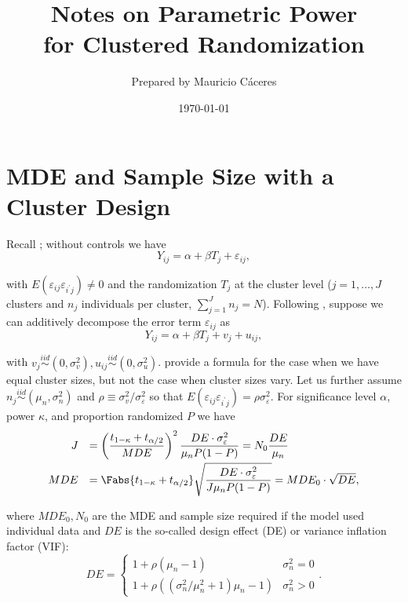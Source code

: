 \documentclass{article}
\title{\bfseries Notes on Parametric Power \\ for Clustered Randomization}
\author{\sffamily Prepared by Mauricio C\'aceres}
\date{\sffamily \today}
\renewcommand{\displayoptions}{
  \maketitle
  \pagenumbering{arabic}
}
\begin{document}
\displayoptions

\section{MDE and Sample Size with a Cluster Design}
\label{sec:mde_and_sample_size_with_a_cluster_design}

Recall ; without controls we have
\begin{equation}
\label{eq:cluster_reg}
Y_{ij} = \alpha + \beta T_j + \varepsilon_{ij},
\end{equation}

with $E (\varepsilon_{ij} \varepsilon_{i^\prime j}) \ne 0$ and the randomization $T_j$ at the cluster level ($j = 1, \ldots, J$ clusters and $n_j$ individuals per cluster, $\sum^{J}_{j = 1} n_j = N$). Following \citet[p. 3921-2]{DufloGlennersterKremer2007}, suppose we can additively decompose the error term $\varepsilon_{ij}$ as
\begin{equation}
\label{eq:cluster_reg_additive}
Y_{ij} = \alpha + \beta T_j + v_j + u_{ij},
\end{equation}

with $v_j \stackrel{iid}{\sim} (0, \sigma_v^2), u_{ij} \stackrel{iid}{\sim} (0, \sigma_u^2)$. \citeauthor{DufloGlennersterKremer2007} provide a formula for the case when we have equal cluster sizes, but not the case when cluster sizes vary. Let us further assume $n_j \stackrel{iid}{\sim} (\mu_n, \sigma^2_n)$ and $\rho \equiv \sigma_v^2 / \sigma_\varepsilon^2$ so that $E (\varepsilon_{ij} \varepsilon_{i^\prime j}) = \rho \sigma_\varepsilon^2$. For significance level $\alpha$, power $\kappa$, and proportion randomized $P$ we have
\begin{equation}
  \begin{array}{rl}
    J   & = \left(\dfrac{t_{1 - \kappa} + t_{\alpha / 2}}{MDE}\right)^2 \dfrac{DE \cdot \sigma_\varepsilon^2}{\mu_n P(1 - P)}
          = N_0 \dfrac{DE}{\mu_n} \\[9pt]
    MDE & = \Fabs{t_{1 - \kappa} + t_{\alpha / 2}} \sqrt{\dfrac{DE \cdot \sigma_\varepsilon^2}{J \mu_n P(1 - P)}}
          = MDE_0 \cdot \sqrt{DE},
  \end{array}
\end{equation}

where $MDE_0, N_0$ are the MDE and sample size required if the model used individual data and $DE$ is the so-called design effect (DE) or variance inflation factor (VIF):
\begin{equation}
  DE =
  \begin{cases}
    1 + \rho (\mu_n - 1) & \sigma^2_n = 0 \\
    1 + \rho ((\sigma^2_n / \mu_n^2 + 1) \mu_n - 1) & \sigma^2_n > 0
  \end{cases}.
\end{equation}
\end{document}
